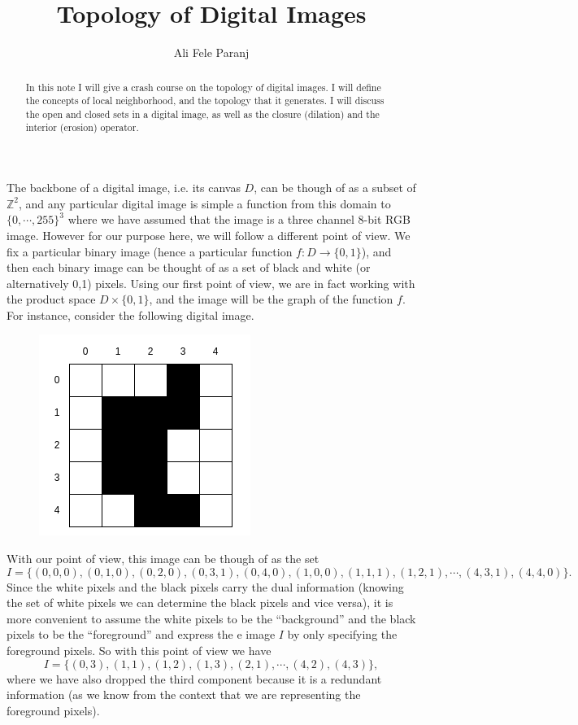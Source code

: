 \documentclass[11pt,a4paper]{article}
\title{Topology of Digital Images}
\author{Ali Fele Paranj}
\newcommand{\Z}{\mathbb{Z}}
\newcommand{\set}[1]{\{#1\}}
\theoremstyle{definition}
\theoremstyle{remark}
\begin{document}
	
	\maketitle
	\begin{abstract}
		In this note I will give a crash course on the topology of digital images. I will define the concepts of local neighborhood, and the topology that it generates. I will discuss the open and closed sets in a digital image, as well as the closure (dilation) and the interior (erosion) operator.
	\end{abstract}
	
	The backbone of a digital image, i.e. its canvas $ D $, can be though of as a subset of $ \Z^2 $, and any particular digital image is simple a function from this domain to $ \set{0,\cdots,255}^3 $ where we have assumed that the image is a three channel 8-bit RGB image. However for our purpose here, we will follow a different point of view. We fix a particular binary image (hence a particular function $ f: D\to \set{0,1} $), and then each binary image can be thought of as a set of black and white (or alternatively 0,1) pixels. Using our first point of view, we are in fact working with the product space $ D\times\set{0,1} $, and the image will be the graph of the function $ f $. For instance, consider the following digital image.
	\begin{figure}[h!]
		\centering
		\includegraphics[width=0.3\linewidth]{images/digitalImageExample}
		\label{fig:digitalimageexample}
	\end{figure}

	\FloatBarrier
	With our point of view, this image can be though of as the set
	\[ I = \set{(0,0,0),(0,1,0),(0,2,0),(0,3,1),(0,4,0),(1,0,0),(1,1,1),(1,2,1),\cdots,(4,3,1),(4,4,0)}. \]
	Since the white pixels and the black pixels carry the dual information (knowing the set of white pixels we can determine the black pixels and vice versa), it is more convenient to assume the white pixels to be the ``background'' and the black pixels to be the ``foreground'' and express the e image $ I $ by only specifying the foreground pixels. So with this point of view we have
	\[ I = \set{(0,3),(1,1),(1,2),(1,3),(2,1),\cdots,(4,2),(4,3)}, \tag{1}\]
	where we have also dropped the third component because it is a redundant information (as we know from the context that we are representing the foreground pixels). 
	
\end{document}

